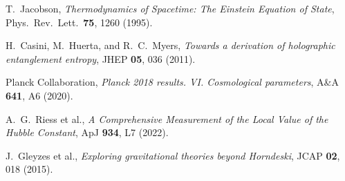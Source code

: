 \documentclass[aps,prd,preprint,onecolumn,longbibliography,nofootinbib]{revtex4-2}
\theoremstyle{plain}
\theoremstyle{remark}
\begin{document}
\begin{thebibliography}{99}

T.~Jacobson, \emph{Thermodynamics of Spacetime: The Einstein Equation of State}, Phys.\ Rev.\ Lett.\ \textbf{75}, 1260 (1995).

H.~Casini, M.~Huerta, and R.~C.~Myers, \emph{Towards a derivation of holographic entanglement entropy}, JHEP \textbf{05}, 036 (2011).

Planck Collaboration, \emph{Planck 2018 results. VI. Cosmological parameters}, A\&A \textbf{641}, A6 (2020).

A.~G.~Riess et al., \emph{A Comprehensive Measurement of the Local Value of the Hubble Constant}, ApJ \textbf{934}, L7 (2022).

J.~Gleyzes et al., \emph{Exploring gravitational theories beyond Horndeski}, JCAP \textbf{02}, 018 (2015).

\end{thebibliography}
\end{document}
